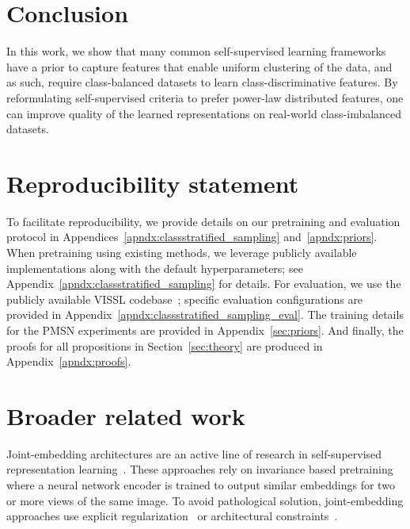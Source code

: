 \documentclass{article} %
\begin{document}
\section{Conclusion}
In this work, we show that many common self-supervised learning frameworks have a prior to capture features that enable uniform clustering of the data, and as such, require class-balanced datasets to learn class-discriminative features.
By reformulating self-supervised criteria to prefer power-law distributed features, one can improve quality of the learned representations on real-world class-imbalanced datasets.


\vfill
\pagebreak
\section*{Reproducibility statement}

To facilitate reproducibility, we provide details on our pretraining and evaluation protocol in Appendices~\ref{apndx:classstratified_sampling} and~\ref{apndx:priors}.
When pretraining using existing methods, we leverage publicly available implementations along with the default hyperparameters; see Appendix~\ref{apndx:classstratified_sampling} for details.
For evaluation, we use the publicly available VISSL codebase~\citep{goyal2021vissl}; specific evaluation configurations are provided in Appendix~\ref{apndx:classstratified_sampling_eval}. 
The training details for the PMSN experiments are provided in Appendix~\ref{sec:priors}.
And finally, the proofs for all propositions in Section~\ref{sec:theory} are produced in Appendix~\ref{apndx:proofs}.



\vfill
\pagebreak
\appendix
% 

\section{Broader related work}
\label{apndx:relatedwork}


Joint-embedding architectures are an active line of research in self-supervised representation  learning~\citep{wu2018unsupervised,he2019moco,chen2020exploring,grill2020bootstrap,chen2020mocov2,caron2021emerging,bardes2021vicreg,zhou2021ibotyes}.
These approaches rely on invariance based pretraining where a neural network encoder is trained to output similar embeddings for two or more views of the same image. To avoid pathological solution, joint-embedding approaches use explicit regularization~\citep{chen2020simple, caron2021emerging, bardes2021vicreg, assran2021semi} or architectural constraints~\citep{grill2020bootstrap,chen2020exploring}.
\end{document}

